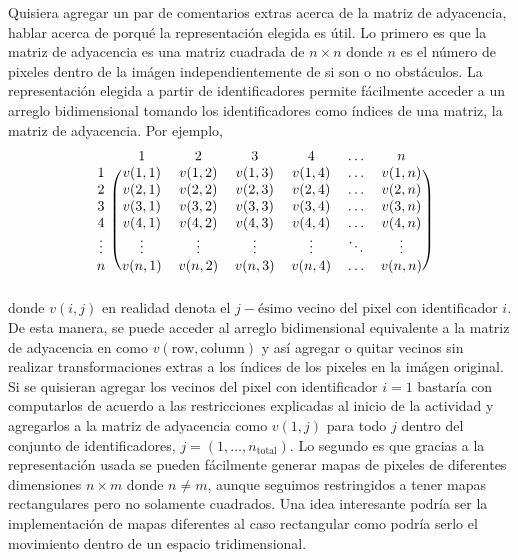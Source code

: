 \begin{enumerate}
\begin{solution}
        Quisiera agregar un par de comentarios extras acerca de la matriz de adyacencia, hablar acerca de porqué la representación elegida es útil. Lo primero es que la matriz de adyacencia es una matriz cuadrada de $n \times n$ donde $n$ es el número de pixeles dentro de la imágen independientemente de si son o no obstáculos. La representación elegida a partir de identificadores permite fácilmente acceder a un arreglo bidimensional tomando los identificadores como índices de una matriz, la matriz de adyacencia. Por ejemplo,
        \begin{equation*}
        \begin{blockarray}{c c c c c c c}
            & 1 & 2 & 3 & 4 & \hdots & n \\
            \begin{block}{c (c c c c c c)}
                1 & v(1,1) & v(1,2) & v(1,3) & v(1,4) & \hdots & v(1,n) \\
                2 & v(2,1) & v(2,2) & v(2,3) & v(2,4) & \hdots & v(2,n) \\
                3 & v(3,1) & v(3,2) & v(3,3) & v(3,4) & \hdots & v(3,n) \\
                4 & v(4,1) & v(4,2) & v(4,3) & v(4,4) & \hdots & v(4,n) \\
                \vdots & \vdots & \vdots & \vdots & \vdots & \ddots & \vdots \\
                n & v(n,1) & v(n,2) & v(n,3) & v(n,4) & \hdots & v(n,n) \\
            \end{block}
        \end{blockarray}
        \end{equation*}
        donde $v(i,j)$ en realidad denota el $j-\text{ésimo}$ vecino del pixel con identificador $i$. De esta manera, se puede acceder al arreglo bidimensional equivalente a la matriz de adyacencia en  como $v(\text{row}, \text{column})$ y así agregar o quitar vecinos sin realizar transformaciones extras a los índices de los pixeles en la imágen original. Si se quisieran agregar los vecinos del pixel con identificador $i=1$ bastaría con computarlos de acuerdo a las restricciones explicadas al inicio de la actividad y agregarlos a la matriz de adyacencia como $v(1, j)$ para todo $j$ dentro del conjunto de identificadores, $j = (1,\ldots,n_{\text{total}})$. Lo segundo es que gracias a la representación usada se pueden fácilmente generar mapas de pixeles de diferentes dimensiones $n \times m$ donde $n \neq m$, aunque seguimos restringidos a tener mapas rectangulares pero no solamente cuadrados. Una idea interesante podría ser la implementación de mapas diferentes al caso rectangular como podría serlo el movimiento dentro de un espacio tridimensional.


\end{solution}
\end{enumerate}
